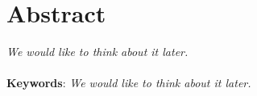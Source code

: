 \chapter*{Abstract}
\textit{We would like to think about it later.} \\
\\ \textbf{Keywords}: \textit{We would like to think about it later.}
\clearpage
